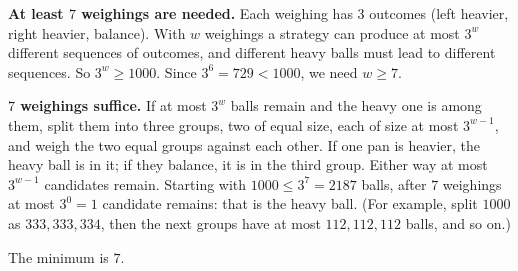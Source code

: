 \textbf{At least $7$ weighings are needed.} Each weighing has $3$ outcomes (left heavier, right heavier, balance). With $w$ weighings a strategy can produce at most $3^w$ different sequences of outcomes, and different heavy balls must lead to different sequences. So $3^w\ge1000$. Since $3^6=729<1000$, we need $w\ge7$.

\textbf{$7$ weighings suffice.} If at most $3^w$ balls remain and the heavy one is among them, split them into three groups, two of equal size, each of size at most $3^{w-1}$, and weigh the two equal groups against each other. If one pan is heavier, the heavy ball is in it; if they balance, it is in the third group. Either way at most $3^{w-1}$ candidates remain. Starting with $1000\le3^7=2187$ balls, after $7$ weighings at most $3^0=1$ candidate remains: that is the heavy ball. (For example, split $1000$ as $333,333,334$, then the next groups have at most $112,112,112$ balls, and so on.)

The minimum is $\boxed{7}$.
